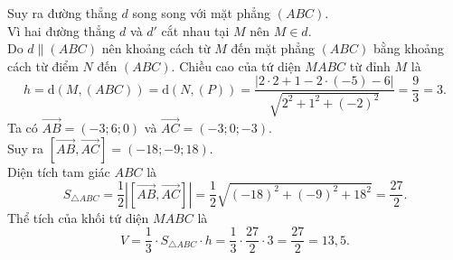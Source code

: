 \begin{ex}
{		Suy ra đường thẳng $d$ song song với mặt phẳng $(ABC)$. \\
		Vì hai đường thẳng $d$ và $d'$ cắt nhau tại $M$ nên $M \in d$. \\
		Do $d \parallel (ABC)$ nên khoảng cách từ $M$ đến mặt phẳng $(ABC)$ bằng khoảng cách từ điểm $N$ đến $(ABC)$. Chiều cao của tứ diện $MABC$ từ đỉnh $M$ là
		$$ h = \mathrm{d}(M, (ABC)) = \mathrm{d}(N, (P)) = \dfrac{|2 \cdot 2 + 1 - 2 \cdot (-5) - 6|}{\sqrt{2^2 + 1^2 + (-2)^2}} = \dfrac{9}{3} = 3. $$
		Ta có $\overrightarrow{AB} = (-3;6;0)$ và $\overrightarrow{AC} = (-3;0;-3)$. \\
		Suy ra $\left[\overrightarrow{AB}, \overrightarrow{AC}\right] = (-18; -9; 18)$. \\
		Diện tích tam giác $ABC$ là
		$$ S_{\triangle ABC} = \dfrac{1}{2} \left|\left[\overrightarrow{AB}, \overrightarrow{AC}\right]\right| = \dfrac{1}{2} \sqrt{(-18)^2 + (-9)^2 + 18^2} = \dfrac{27}{2}. $$
		Thể tích của khối tứ diện $MABC$ là
		$$ V = \dfrac{1}{3} \cdot S_{\triangle ABC} \cdot h = \dfrac{1}{3} \cdot \dfrac{27}{2} \cdot 3 = \dfrac{27}{2} = 13{,}5. $$
	}
\end{ex}

